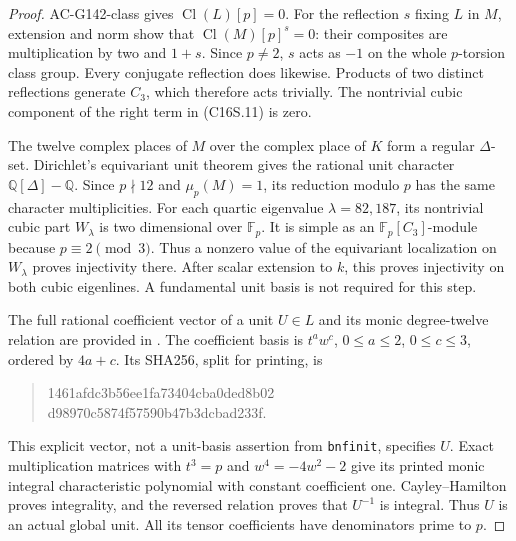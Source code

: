 \begin{proof}
AC-G142-class gives $\operatorname{Cl}(L)[p]=0$.
For the reflection $s$ fixing $L$ in $M$, extension and norm
show that $\operatorname{Cl}(M)[p]^s=0$: their composites
are multiplication by two and $1+s$.  Since $p\ne2$,
$s$ acts as $-1$ on the whole $p$-torsion class group.
Every conjugate reflection does likewise.  Products of
two distinct reflections generate $C_3$, which therefore
acts trivially.  The nontrivial cubic component of the
right term in (C16S.11) is zero.

The twelve complex places of $M$ over the complex place of
$K$ form a regular $\Delta$-set.  Dirichlet's equivariant
unit theorem gives the rational unit character
$\mathbb Q[\Delta]-\mathbb Q$.
Since $p\nmid12$ and $\mu_p(M)=1$, its reduction modulo
$p$ has the same character multiplicities.  For each
quartic eigenvalue $\lambda=82,187$, its nontrivial cubic
part $W_\lambda$ is two dimensional over $\mathbb F_p$.
It is simple as an $\mathbb F_p[C_3]$-module because
$p\equiv2\pmod3$.  Thus a nonzero value of the equivariant
localization on $W_\lambda$ proves injectivity there.
After scalar extension to $k$, this proves injectivity
on both cubic eigenlines.  A fundamental unit basis is
not required for this step.

The full rational coefficient vector of a unit $U\in L$
and its monic degree-twelve relation are provided in
.
The coefficient basis is $t^a w^c$, $0\leq a\leq2$,
$0\leq c\leq3$, ordered by $4a+c$.
Its SHA256, split for printing, is
\begin{quote}\ttfamily\small
1461afdc3b56ee1fa73404cba0ded8b02\\
d98970c5874f57590b47b3dcbad233f.
\end{quote}
This explicit vector, not a unit-basis assertion from
\texttt{bnfinit}, specifies $U$.  Exact multiplication
matrices with $t^3=p$ and $w^4=-4w^2-2$ give its printed
monic integral characteristic polynomial with constant
coefficient one.  Cayley--Hamilton proves integrality,
and the reversed relation proves that $U^{-1}$ is integral.
Thus $U$ is an actual global unit.  All its tensor
coefficients have denominators prime to $p$.


\end{proof}
